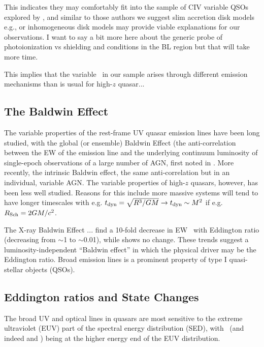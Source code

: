 \documentclass[a4paper,fleqn,usenatbib]{mnras}
\begin{document}
This indicates they may comfortably fit into the sample of CIV
variable QSOs explored by \citet{Dyer2019}, and similar to those
authors we suggest slim accretion disk models e.g., 
\citet[][]{Abramowicz1988} or inhomogeneous disk models
\citep[e.g.,][]{DexterAgol2011} may provide viable explanations for
our observations. I want to say a bit more here about the generic
probe of photoionization vs shielding and conditions in the BL region
but that will take more time.

This implies that the variable \civ\ in our sample arises through
different emission mechanisms than is usual for high-$z$ quasar...


\subsection{The Baldwin Effect}
The variable properties of the rest-frame UV quasar emission lines
have been long studied, with the global (or ensemble) Baldwin Effect
(the anti-correlation between the EW of the emission line and the
underlying continuum luminosity of single-epoch observations of a
large number of AGN, first noted in \citet{Baldwin1977}.  More
recently, the intrinsic Baldwin effect, the same anti-correlation but
in an individual, variable AGN.  The variable properties of high-$z$
quasars, however, has been less well studied. Reasons for this include
more massive systems will tend to have longer timescales with e.g.
$t_{\rm dyn} = \sqrt{ R^{3}/GM} \rightarrow  t_{\rm dyn}  \sim M^{2}$
if e.g. $R_{\rm Sch}= 2GM /c^{2}$.

The X-ray Baldwin Effect \citep[e.g., ][]{Iwasawa_Taniguchi1993}... 
\citet{Bachev2004} find a 10-fold decrease in EW \civ\ with Eddington
ratio (decreasing from $\sim$1 to $\sim$0.01), while \nv shows no
change. These trends suggest a luminosity-independent ``Baldwin
effect'' in which the physical driver may be the Eddington ratio.
\citet{Ge2016} Broad emission lines is a prominent property of type I quasi-stellar objects (QSOs). 



\subsection{Eddington ratios and State Changes} 
The broad UV and optical lines in quasars are most sensitive to the
extreme ultraviolet (EUV) part of the spectral energy distribution
(SED), with \civ\ (and indeed \heii and \nv) being at the higher
energy end of the EUV distribution.
\end{document}
